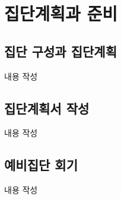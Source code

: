 \section{집단계획과 준비}

\subsection{집단 구성과 집단계획}
내용 작성

\subsection{집단계획서 작성}
내용 작성

\subsection{예비집단 회기}
내용 작성
